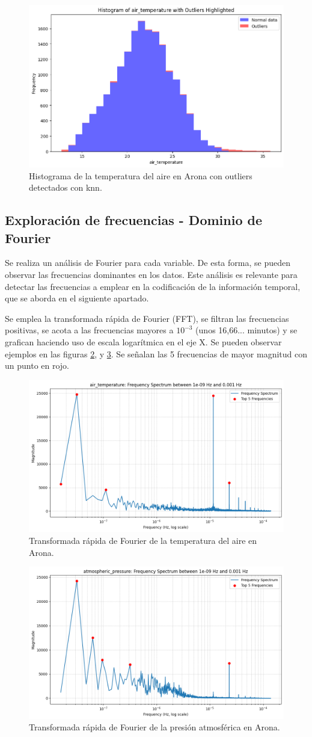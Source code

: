 \begin{figure}
    \centering
    \includegraphics[width=.5\linewidth]{images/histogram_temperature_knn.png}
    \caption{Histograma de la temperatura del aire en Arona con outliers detectados con knn.}
    \label{histogram_knn_temperature}
\end{figure}

\subsection{Exploración de frecuencias - Dominio de Fourier}
Se realiza un análisis de Fourier para cada variable. De esta forma, se pueden observar las frecuencias dominantes en los datos. Este análisis
es relevante para detectar las frecuencias a emplear en la codificación de la información temporal, que se aborda en el siguiente apartado.

Se emplea la transformada rápida de Fourier (FFT), se filtran las frecuencias positivas, se acota a las frecuencias mayores a \(10^{-3}\) 
 (unos 16,66... minutos) y se grafican haciendo uso de escala logarítmica en el eje X. Se pueden observar ejemplos en las figuras \ref{fft_temperature},
 y \ref{fft_pressure}. Se señalan las 5 frecuencias de mayor magnitud con un punto en rojo. 

\begin{figure}
    \centering
    \includegraphics[width=.5\linewidth]{images/fft_temperature.png}
    \caption{Transformada rápida de Fourier de la temperatura del aire en Arona.}
    \label{fft_temperature}
\end{figure}

 \begin{figure}
    \centering
    \includegraphics[width=.5\linewidth]{images/fft_pressure.png}
    \caption{Transformada rápida de Fourier de la presión atmosférica en Arona.}
    \label{fft_pressure}
\end{figure}



